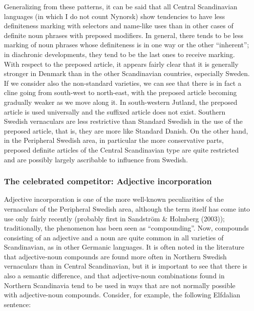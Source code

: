 Generalizing from these patterns, it can be said that all Central Scandinavian languages (in which I do not count Nynorsk) show tendencies to have less definiteness marking with selectors and name-like uses than in other cases of definite noun phrases with preposed modifiers. In general, there tends to be less marking of noun phrases whose definiteness is in one way or the other “inherent”; in diachronic developments, they tend to be the last ones to receive marking. With respect to the preposed article, it appears fairly clear that it is generally stronger in Denmark than in the other Scandinavian countries, especially Sweden. If we consider also the non-standard varieties, we can see that there is in fact a cline going from south-west to north-east, with the preposed article becoming gradually weaker as we move along it. In south-western Jutland, the preposed article is used universally and the suffixed article does not exist. Southern Swedish vernaculars are less restrictive than Standard Swedish in the use of the preposed article, that is, they are more like Standard Danish. On the other hand, in the Peripheral Swedish area, in particular the more conservative parts, preposed definite articles of the Central Scandinavian type are quite restricted and are possibly largely ascribable to influence from Swedish. 

\subsubsection[The celebrated competitor: Adjective incorporation]{\rmfamily The celebrated competitor: Adjective incorporation}
Adjective incorporation is one of the more well-known peculiarities of the vernaculars of the Peripheral Swedish area, although the term itself has come into use only fairly recently (probably first in Sandström \& Holmberg (2003)); traditionally, the phenomenon has been seen as “compounding”. Now, compounds consisting of an adjective and a noun are quite common in all varieties of Scandinavian, as in other Germanic languages. It is often noted in the literature that adjective-noun compounds are found more often in Northern Swedish vernaculars than in Central Scandinavian, but it is important to see that there is also a semantic difference, and that adjective-noun combinations found in Northern Scandinavia tend to be used in ways that are not normally possible with adjective-noun compounds. Consider, for example, the following Elfdalian sentence:

